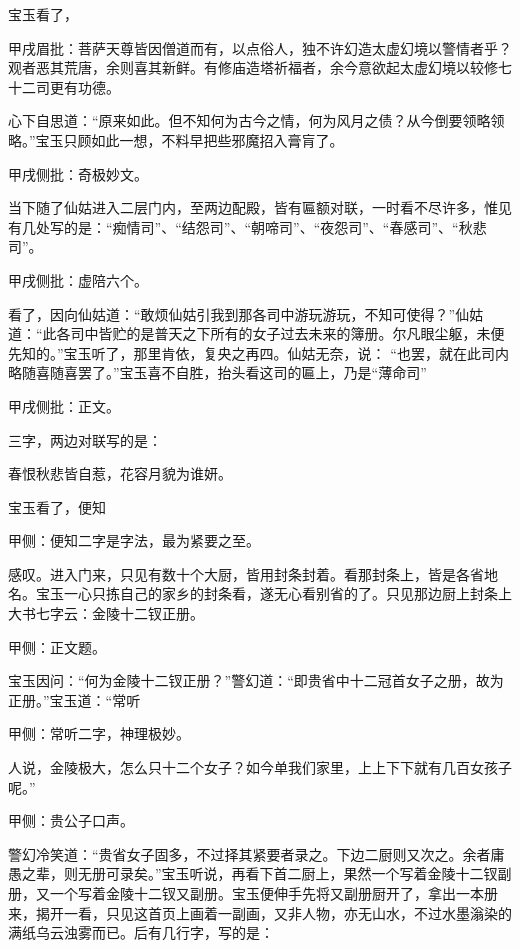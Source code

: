 \begin{parag}
    宝玉看了，\begin{note}甲戌眉批：菩萨天尊皆因僧道而有，以点俗人，独不许幻造太虚幻境以警情者乎？观者恶其荒唐，余则喜其新鲜。有修庙造塔祈福者，余今意欲起太虚幻境以较修七十二司更有功德。\end{note}心下自思道：“原来如此。但不知何为古今之情，何为风月之债？从今倒要领略领略。”宝玉只顾如此一想，不料早把些邪魔招入膏肓了。\begin{note}甲戌侧批：奇极妙文。\end{note}当下随了仙姑进入二层门内，至两边配殿，皆有匾额对联，一时看不尽许多，惟见有几处写的是：“痴情司”、“结怨司”、“朝啼司”、“夜怨司”、“春感司”、“秋悲司”。\begin{note}甲戌侧批：虚陪六个。\end{note}看了，因向仙姑道：“敢烦仙姑引我到那各司中游玩游玩，不知可使得？”仙姑道：“此各司中皆贮的是普天之下所有的女子过去未来的簿册。尔凡眼尘躯，未便先知的。”宝玉听了，那里肯依，复央之再四。仙姑无奈，说： “也罢，就在此司内略随喜随喜罢了。”宝玉喜不自胜，抬头看这司的匾上，乃是“薄命司”\begin{note}甲戌侧批：正文。\end{note}三字，两边对联写的是：
\end{parag}


\begin{poem}\begin{pl}春恨秋悲皆自惹，花容月貌为谁妍。\end{pl}\end{poem}


\begin{parag}
    宝玉看了，便知\begin{note}甲侧：便知二字是字法，最为紧要之至。\end{note}感叹。进入门来，只见有数十个大厨，皆用封条封着。看那封条上，皆是各省地名。宝玉一心只拣自己的家乡的封条看，遂无心看别省的了。只见那边厨上封条上大书七字云：金陵十二钗正册。\begin{note}甲侧：正文题。\end{note}宝玉因问：“何为金陵十二钗正册？”警幻道：“即贵省中十二冠首女子之册，故为正册。”宝玉道：“常听\begin{note}甲侧：常听二字，神理极妙。\end{note}人说，金陵极大，怎么只十二个女子？如今单我们家里，上上下下就有几百女孩子呢。”\begin{note}甲侧：贵公子口声。\end{note}警幻冷笑道：“贵省女子固多，不过择其紧要者录之。下边二厨则又次之。余者庸愚之辈，则无册可录矣。”宝玉听说，再看下首二厨上，果然一个写着金陵十二钗副册，又一个写着金陵十二钗又副册。宝玉便伸手先将又副册厨开了，拿出一本册来，揭开一看，只见这首页上画着一副画，又非人物，亦无山水，不过水墨滃染的满纸乌云浊雾而已。后有几行字，写的是：
\end{parag}


